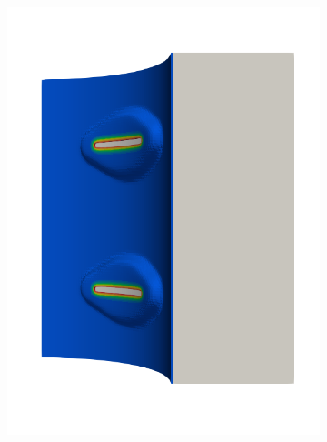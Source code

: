 \begin{frame}
\begin{columns}[T]
\begin{column}{0.6\textwidth}
\begin{figure}
{\begin{subfigure}{0.19\textwidth}
            \includegraphics[width=\textwidth]{examples/figures/seed_d_4}
          \end{subfigure}
          \hspace{0.06\textwidth}
          \begin{subfigure}{0.19\textwidth}
            \centering

\end{subfigure}}
\end{figure}
\end{column}
\end{columns}
\end{frame}
